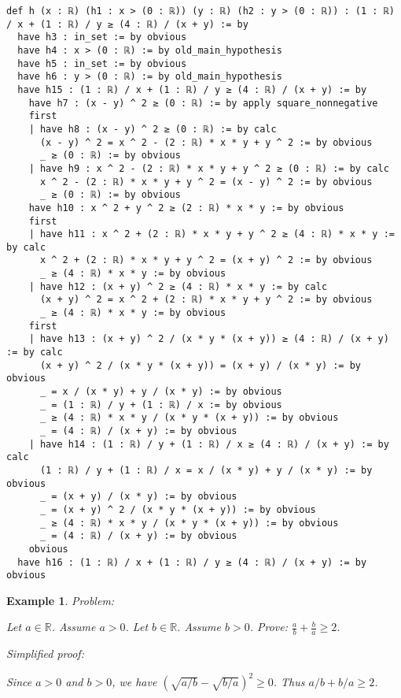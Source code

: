 \documentclass{article}
\newtheorem{example}{Example}
\begin{document}
\begin{tcolorbox}[colback=white!10, width=\linewidth]
\begin{lstlisting}[language=Lean4]
def h (x : ℝ) (h1 : x > (0 : ℝ)) (y : ℝ) (h2 : y > (0 : ℝ)) : (1 : ℝ) / x + (1 : ℝ) / y ≥ (4 : ℝ) / (x + y) := by
  have h3 : in_set := by obvious
  have h4 : x > (0 : ℝ) := by old_main_hypothesis
  have h5 : in_set := by obvious
  have h6 : y > (0 : ℝ) := by old_main_hypothesis
  have h15 : (1 : ℝ) / x + (1 : ℝ) / y ≥ (4 : ℝ) / (x + y) := by
    have h7 : (x - y) ^ 2 ≥ (0 : ℝ) := by apply square_nonnegative
    first
    | have h8 : (x - y) ^ 2 ≥ (0 : ℝ) := by calc
      (x - y) ^ 2 = x ^ 2 - (2 : ℝ) * x * y + y ^ 2 := by obvious
      _ ≥ (0 : ℝ) := by obvious
    | have h9 : x ^ 2 - (2 : ℝ) * x * y + y ^ 2 ≥ (0 : ℝ) := by calc
      x ^ 2 - (2 : ℝ) * x * y + y ^ 2 = (x - y) ^ 2 := by obvious
      _ ≥ (0 : ℝ) := by obvious
    have h10 : x ^ 2 + y ^ 2 ≥ (2 : ℝ) * x * y := by obvious
    first
    | have h11 : x ^ 2 + (2 : ℝ) * x * y + y ^ 2 ≥ (4 : ℝ) * x * y := by calc
      x ^ 2 + (2 : ℝ) * x * y + y ^ 2 = (x + y) ^ 2 := by obvious
      _ ≥ (4 : ℝ) * x * y := by obvious
    | have h12 : (x + y) ^ 2 ≥ (4 : ℝ) * x * y := by calc
      (x + y) ^ 2 = x ^ 2 + (2 : ℝ) * x * y + y ^ 2 := by obvious
      _ ≥ (4 : ℝ) * x * y := by obvious
    first
    | have h13 : (x + y) ^ 2 / (x * y * (x + y)) ≥ (4 : ℝ) / (x + y) := by calc
      (x + y) ^ 2 / (x * y * (x + y)) = (x + y) / (x * y) := by obvious
      _ = x / (x * y) + y / (x * y) := by obvious
      _ = (1 : ℝ) / y + (1 : ℝ) / x := by obvious
      _ ≥ (4 : ℝ) * x * y / (x * y * (x + y)) := by obvious
      _ = (4 : ℝ) / (x + y) := by obvious
    | have h14 : (1 : ℝ) / y + (1 : ℝ) / x ≥ (4 : ℝ) / (x + y) := by calc
      (1 : ℝ) / y + (1 : ℝ) / x = x / (x * y) + y / (x * y) := by obvious
      _ = (x + y) / (x * y) := by obvious
      _ = (x + y) ^ 2 / (x * y * (x + y)) := by obvious
      _ ≥ (4 : ℝ) * x * y / (x * y * (x + y)) := by obvious
      _ = (4 : ℝ) / (x + y) := by obvious
    obvious
  have h16 : (1 : ℝ) / x + (1 : ℝ) / y ≥ (4 : ℝ) / (x + y) := by obvious

\end{lstlisting}
\end{tcolorbox}


\begin{example}
Problem:
\begin{tcolorbox}[colback=yellow!10, width=\linewidth]
Let $a\in\mathbb{R}$. Assume $a > 0$.
    Let $b\in\mathbb{R}$. Assume $b > 0$.
    Prove: $\frac{a}{b} + \frac{b}{a} \ge 2$.
\end{tcolorbox}

Simplified proof:
\begin{tcolorbox}[colback=blue!10, width=\linewidth]
Since $a>0$ and $b>0$, we have $(\sqrt{a/b} - \sqrt{b/a})^2 \ge 0$. Thus $a/b + b/a \ge 2$.
\end{tcolorbox}
\end{example}
\end{document}
